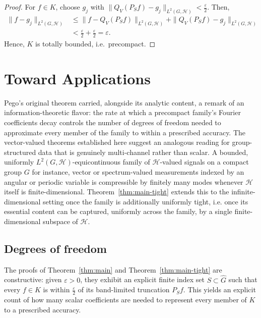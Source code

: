 \documentclass[11pt]{amsart}
\begin{document}
\begin{proof}
 For $f\in K$, choose $g_j$ with $\|Q_V(P_Sf)-g_j\|_{L^2(G,\mathcal{H})}
<\frac{\varepsilon}{2}$.  Then, 
\begin{align*}
\|f-g_j\|_{L^2(G,\mathcal{H})}&\le\|f-Q_V(P_Sf)\|_{L^2(G,\mathcal{H})}+
\|Q_V(P_Sf)-g_j\|_{L^2(G,\mathcal{H})}\\
&<\frac{\varepsilon}{2}+\frac{\varepsilon}{2}=\varepsilon.
\end{align*}
 Hence, $K$ is totally bounded, i.e.\ precompact.
\end{proof}

















\section*{Toward Applications}
Pego's original theorem carried, alongside its analytic content, a remark of an information-theoretic flavor: the rate at which a precompact family's Fourier coefficients decay controls the number of degrees of freedom needed to approximate every member of the family to within a prescribed accuracy. The vector-valued theorems established here suggest an analogous reading for group-structured data that is genuinely multi-channel rather than scalar. A bounded, uniformly $L^2(G,\mathcal{H})$-equicontinuous family of $\mathcal{H}$-valued signals on a compact group $G$ for instance, vector or spectrum-valued measurements indexed by an angular or periodic variable is  compressible by finitely many modes whenever $\mathcal{H}$ itself is finite-dimensional. Theorem~\ref{thm:main-tight} extends this to the infinite-dimensional setting once the family is additionally uniformly tight, i.e. once its essential content can be captured, uniformly across the family, by a single finite-dimensional subspace of $\mathcal{H}$.




 
\subsection*{Degrees of freedom}

The proofs of Theorem~\ref{thm:main} and Theorem~\ref{thm:main-tight} are constructive: given
$\varepsilon>0$, they exhibit an explicit finite index set $S\subset\widehat G$
such that every $f\in K$ is within $\frac{\varepsilon}{2}$
of its band-limited truncation $P_Sf$. This yields an explicit count of how
many scalar coefficients are needed to represent every member of $K$ to a
prescribed accuracy.
\end{document}
